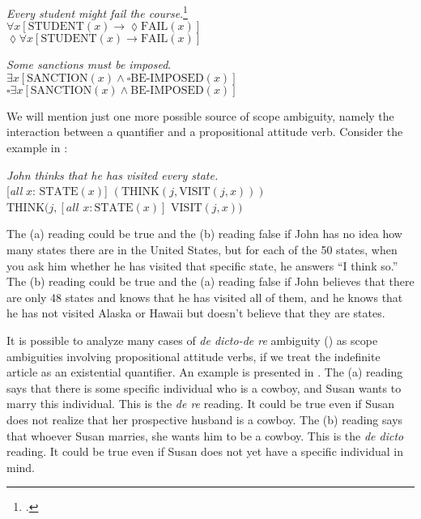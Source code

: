 \ea \label{ex:14.37}
\textit{Every student might fail the course}.\footnote{\citet[48]{Abbott2010}.}\\
\ea $\forall x[\text{STUDENT}(x) \rightarrow \lozenge \text{FAIL}(x)]$\\
\ex $\lozenge \forall x[\text{STUDENT}(x) \rightarrow \text{FAIL}(x)]$
\z 

\ex \label{ex:14.38}
\textit{Some sanctions must be imposed}.\\
\ea $\exists x[\text{SANCTION}(x) \wedge \square \text{BE-IMPOSED}(x)]$\\
\ex $\square \exists x[\text{SANCTION}(x) \wedge \text{BE-IMPOSED}(x)]$
\z \z


We will mention just one more possible source of scope ambiguity, namely the interaction between a quantifier and a propositional attitude verb. Consider the example in :


\ea \label{ex:14.39}
\textit{John thinks that he has visited every state.}\\
\ea \label{ex:14.}  [\textit{all} $x$: $\text{STATE}(x)$] $(\text{THINK}(j, \text{VISIT}(j,x)))$\\
\ex  $\text{THINK}(j, [\textit{all } x: \text{STATE}(x)]$ $\text{VISIT}(j,x))$
                       \z
\z


The (a) reading could be true and the (b) reading false if John has no idea how many states there are in the United States, but for each of the 50 states, when you ask him whether he has visited that specific state, he answers “I think so.” The (b) reading could be true and the (a) reading false if John believes that there are only 48 states and knows that he has visited all of them, and he knows that he has not visited Alaska or Hawaii but doesn’t believe that they are states.



It is possible to analyze many cases of \textit{de dicto-de re} ambiguity () as scope ambiguities involving propositional attitude verbs, if we treat the indefinite article as an existential quantifier. An example is presented in . The (a) reading says that there is some specific individual who is a cowboy, and Susan wants to marry this individual. This is the \textit{de re} reading. It could be true even if Susan does not realize that her prospective husband is a cowboy. The (b) reading says that whoever Susan marries, she wants him to be a cowboy. This is the \textit{de dicto} reading. It could be true even if Susan does not yet have a specific individual in mind.


